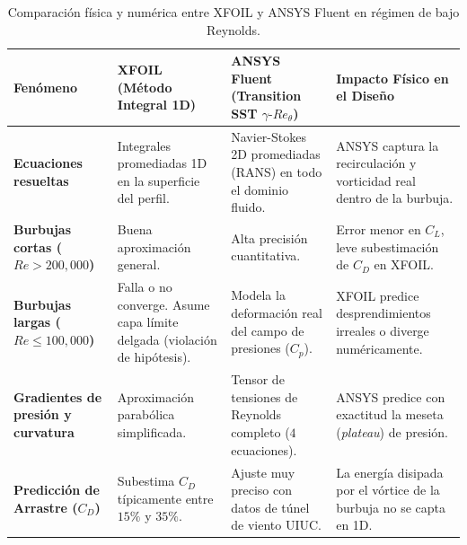 \begin{enumerate}
\begin{table}[htbp]
\centering
\small
\caption{Comparación física y numérica entre XFOIL y ANSYS Fluent en régimen de bajo Reynolds.}
\label{tab:xfoil_vs_ansys}
\begin{tabular}{p{3.2cm} p{4.2cm} p{4.2cm} p{3.2cm}}
\toprule
\textbf{Fenómeno} & \textbf{XFOIL (Método Integral 1D)} & \textbf{ANSYS Fluent (Transition SST $\gamma\text{-}Re_\theta$)} & \textbf{Impacto Físico en el Diseño} \\
\midrule
\textbf{Ecuaciones resueltas} & Integrales promediadas 1D en la superficie del perfil. & Navier-Stokes 2D promediadas (RANS) en todo el dominio fluido. & ANSYS captura la recirculación y vorticidad real dentro de la burbuja. \\
\addlinespace
\textbf{Burbujas cortas ($Re > 200{,}000$)} & Buena aproximación general. & Alta precisión cuantitativa. & Error menor en $C_L$, leve subestimación de $C_D$ en XFOIL. \\
\addlinespace
\textbf{Burbujas largas ($Re \le 100{,}000$)} & Falla o no converge. Asume capa límite delgada (violación de hipótesis). & Modela la deformación real del campo de presiones ($C_p$). & XFOIL predice desprendimientos irreales o diverge numéricamente. \\
\addlinespace
\textbf{Gradientes de presión y curvatura} & Aproximación parabólica simplificada. & Tensor de tensiones de Reynolds completo ($4$ ecuaciones). & ANSYS predice con exactitud la meseta (\textit{plateau}) de presión. \\
\addlinespace
\textbf{Predicción de Arrastre ($C_D$)} & Subestima $C_D$ típicamente entre $15\%$ y $35\%$. & Ajuste muy preciso con datos de túnel de viento UIUC. & La energía disipada por el vórtice de la burbuja no se capta en 1D. \\
\bottomrule
\end{tabular}
\end{table}


\end{enumerate}
